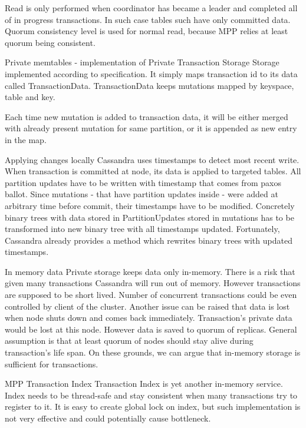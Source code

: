 Read is only performed when coordinator has became a leader and completed all of in progress transactions. In such case tables such have only committed data. Quorum consistency level is used for normal read, because MPP relies at least quorum being consistent.




Private memtables - implementation of Private Transaction Storage
Storage implemented according to specification. It simply maps transaction id to its data called TransactionData. TransactionData keeps mutations mapped by keyspace, table and key.


Each time new mutation is added to transaction data, it will be either merged with already present mutation for same partition, or it is appended as new entry in the map.


Applying changes locally
Cassandra uses timestamps to detect most recent write. When transaction is committed at node, its data is applied to targeted tables. All partition updates have to be written with timestamp that comes from paxos ballot. Since mutations - that have partition updates inside - were added at arbitrary time before commit, their timestamps have to be modified. Concretely binary trees with data stored in PartitionUpdates stored in mutations has to be transformed into new binary tree with all timestamps updated. Fortunately, Cassandra already provides a method which rewrites binary trees with updated timestamps.


In memory data
Private storage keeps data only in-memory. There is a risk that given many transactions Cassandra will run out of memory. However transactions are supposed to be short lived. Number of concurrent transactions could be even controlled by client of the cluster. 
Another issue can be raised that data is lost when node shuts down and comes back immediately. Transaction’s private data would be lost at this node. However data is saved to quorum of replicas. General assumption is that at least quorum of nodes should stay alive during transaction’s life span. On these grounds, we can argue that in-memory storage is sufficient for transactions.






MPP Transaction Index
Transaction Index is yet another in-memory service. Index needs to be thread-safe and stay consistent when many transactions try to register to it. It is easy to create global lock on index, but such implementation is not very effective and could potentially cause bottleneck. 


